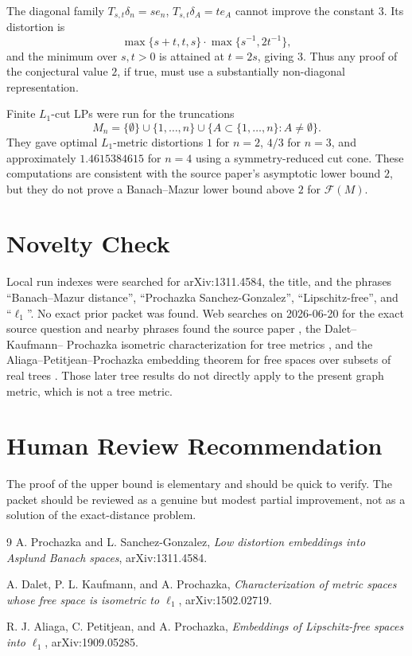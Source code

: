 \documentclass[11pt]{article}
\newcommand{\F}{\mathcal F}
\begin{document}
The diagonal family \(T_{s,t}\delta_n=s e_n\), \(T_{s,t}\delta_A=t e_A\)
cannot improve the constant \(3\).  Its distortion is
\[
\max\{s+t,t, s\}\cdot \max\{s^{-1},2t^{-1}\},
\]
and the minimum over \(s,t>0\) is attained at \(t=2s\), giving \(3\).
Thus any proof of the conjectural value \(2\), if true, must use a
substantially non-diagonal representation.

Finite \(L_1\)-cut LPs were run for the truncations
\[
M_n=\{\emptyset\}\cup\{1,\dots,n\}\cup
\{A\subset\{1,\dots,n\}:A\ne\emptyset\}.
\]
They gave optimal \(L_1\)-metric distortions \(1\) for \(n=2\),
\(4/3\) for \(n=3\), and approximately \(1.4615384615\) for \(n=4\)
using a symmetry-reduced cut cone.  These computations are consistent
with the source paper's asymptotic lower bound \(2\), but they do not
prove a Banach--Mazur lower bound above \(2\) for \(\F(M)\).

\section*{Novelty Check}

Local run indexes were searched for arXiv:1311.4584, the title, and
the phrases ``Banach--Mazur distance'', ``Prochazka Sanchez-Gonzalez'',
``Lipschitz-free'', and ``\(\ell_1\)''.  No exact prior packet was
found.  Web searches on 2026-06-20 for the exact source question and
nearby phrases found the source paper \cite{PSG}, the Dalet--Kaufmann--
Prochazka isometric characterization for tree metrics \cite{DKP}, and
the Aliaga--Petitjean--Prochazka embedding theorem for free spaces over
subsets of real trees \cite{APP}.  Those later tree results do not
directly apply to the present graph metric, which is not a tree metric.

\section*{Human Review Recommendation}

The proof of the upper bound is elementary and should be quick to
verify.  The packet should be reviewed as a genuine but modest partial
improvement, not as a solution of the exact-distance problem.

\begin{thebibliography}{9}
A. Prochazka and L. Sanchez-Gonzalez,
\emph{Low distortion embeddings into Asplund Banach spaces},
arXiv:1311.4584.

A. Dalet, P. L. Kaufmann, and A. Prochazka,
\emph{Characterization of metric spaces whose free space is isometric to \(\ell_1\)},
arXiv:1502.02719.

R. J. Aliaga, C. Petitjean, and A. Prochazka,
\emph{Embeddings of Lipschitz-free spaces into \(\ell_1\)},
arXiv:1909.05285.
\end{thebibliography}
\end{document}
